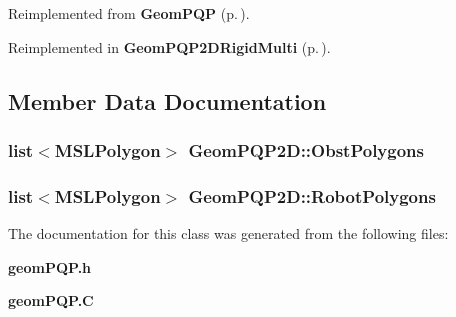 Reimplemented from {\bf Geom\-PQP} {\rm (p.\,\pageref{classGeomPQP_a3})}.

Reimplemented in {\bf Geom\-PQP2DRigid\-Multi} {\rm (p.\,\pageref{classGeomPQP2DRigidMulti_a4})}.

\subsection{Member Data Documentation}
\subsubsection{\setlength{\rightskip}{0pt plus 5cm}list$<${\bf MSLPolygon}$>$ Geom\-PQP2D::Obst\-Polygons}\label{classGeomPQP2D_m0}


\subsubsection{\setlength{\rightskip}{0pt plus 5cm}list$<${\bf MSLPolygon}$>$ Geom\-PQP2D::Robot\-Polygons}\label{classGeomPQP2D_m1}




The documentation for this class was generated from the following files:\begin{CompactItemize}
\item 
{\bf geom\-PQP.h}\item 
{\bf geom\-PQP.C}\end{CompactItemize}
